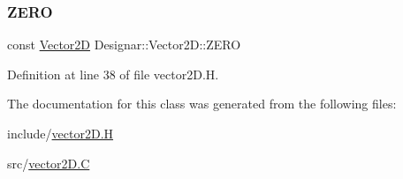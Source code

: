 \subsubsection{\texorpdfstring{Z\+E\+RO}{ZERO}}
{\footnotesize\ttfamily const \hyperlink{class_designar_1_1_vector2_d}{Vector2D} Designar\+::\+Vector2\+D\+::\+Z\+E\+RO\hspace{0.3cm}{\ttfamily [static]}}



Definition at line 38 of file vector2\+D.\+H.



The documentation for this class was generated from the following files\+:\begin{DoxyCompactItemize}
\item 
include/\hyperlink{vector2_d_8_h}{vector2\+D.\+H}\item 
src/\hyperlink{vector2_d_8_c}{vector2\+D.\+C}\end{DoxyCompactItemize}
